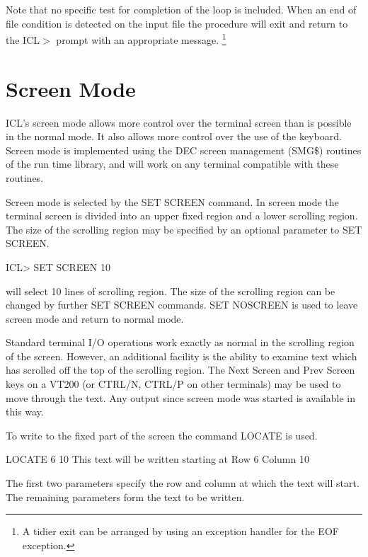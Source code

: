 \documentclass[twoside,11pt,nolof,chapters]{starlink}
\begin{document}
Note that no specific test for completion of the loop is included. When an end
of file condition is detected on the input file the procedure will exit and
return to the ICL$>$ prompt with an appropriate message. \footnote{A tidier
exit can be arranged by using an exception handler for the EOF exception.}

\section{Screen Mode}

ICL's screen mode allows more control over the terminal screen than is possible
in the normal mode. It also allows more control over the use of the keyboard.
Screen mode is implemented using the DEC screen management (SMG\$) routines
of the run time library, and will work on any terminal compatible with these
routines.

Screen mode is selected by the SET SCREEN command. In screen mode the terminal
screen is divided into an upper fixed region and a lower scrolling region.
The size of the scrolling region may be specified by an optional parameter
to SET SCREEN.
\begin{terminalv}

    ICL> SET SCREEN 10

\end{terminalv}
will select 10 lines of scrolling region. The size of the scrolling region
can be changed by further SET SCREEN commands. SET NOSCREEN is used to leave
screen mode and return to normal mode.

Standard terminal I/O operations work exactly as normal in the scrolling
region of the screen. However, an additional facility is the ability to
examine text which has scrolled off the top of the scrolling region. The
Next Screen and Prev Screen keys on a VT200 (or CTRL/N, CTRL/P on other
terminals) may be used to move through the text. Any output since screen
mode was started is available in this way.

To write to the fixed part of the screen the command LOCATE is used.
\begin{terminalv}

    LOCATE 6 10   This text will be written starting at Row 6 Column 10

\end{terminalv}
The first two parameters specify the row and column at which the text will
start. The remaining parameters form the text to be written.
\end{document}
